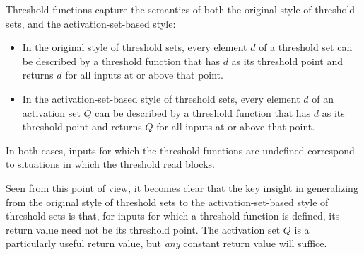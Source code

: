 Threshold functions capture the semantics of both the original
style of threshold sets, and the activation-set-based style:
\begin{itemize}
\item In the original style of threshold sets, every element $d$ of a
  threshold set can be described by a threshold function that has $d$
  as its threshold point and returns $d$ for all inputs at or above
  that point.
\item In the activation-set-based style of threshold sets, every
  element $d$ of an activation set $Q$ can be described by a threshold
  function that has $d$ as its threshold point and returns $Q$ for all
  inputs at or above that point.
\end{itemize}
In both cases, inputs for which the threshold functions are undefined
correspond to situations in which the threshold read blocks.

Seen from this point of view, it becomes clear that the key insight in
generalizing from the original style of threshold sets to the
activation-set-based style of threshold sets is that, for inputs for
which a threshold function is defined, its return value need not be
its threshold point. The activation set $Q$ is a particularly useful
return value, but \emph{any} constant return value will suffice.


